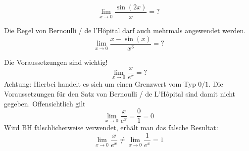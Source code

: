  
 \begin{bsp}
    {}{}
    $$\lim_{x\rightarrow0} \frac{\sin(2x)}{x} = ? $$

    \vspace{3cm}

 \end{bsp}
 \begin{bsp}
    {}{}
    Die Regel von Bernoulli / de l’Hôpital darf auch mehrmals angewendet werden.
    \[
\lim_{{x \to 0}} \frac{{x - \sin(x)}}{{x^3}} =?
\]
\vspace{3cm}

 \end{bsp}

 \begin{bsp}
    {Die Voraussetzungen sind wichtig!}{}
    \[
\lim_{{x \to 0}} \frac{x}{e^x} = ?
\]
Achtung: Hierbei handelt es sich um einen Grenzwert vom Typ $0/1$. Die Voraussetzungen für den Satz von Bernoulli / de L'Hôpital sind damit nicht gegeben. Offensichtlich gilt
\[
\lim_{{x \to 0}} \frac{x}{e^x} = \frac{0}{1} =0
\]
Wird BH fälschlicherweise verwendet, erhält man das falsche Resultat:
\[
\lim_{{x \to 0}} \frac{x}{e^x} \neq \lim_{{x \to 0}} \frac{1}{e^x} = 1 
\]
 \end{bsp}



